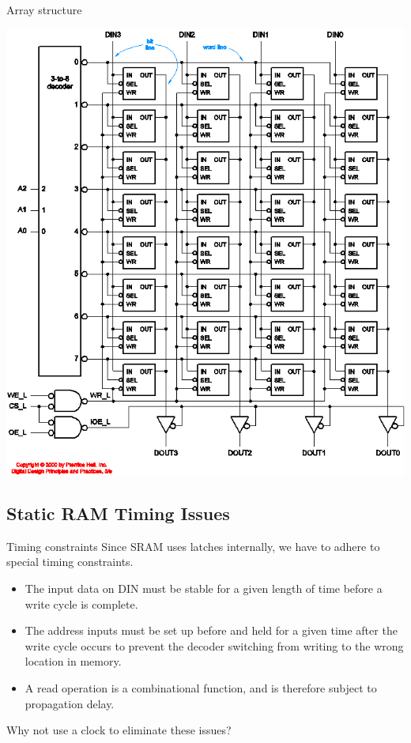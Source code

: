 \begin{frame}{Array structure}
  \begin{center}
    \includegraphics[scale=0.5]{SRAMStructure}
  \end{center}
\end{frame}

\subsection{Static RAM Timing Issues}

\begin{frame}{Timing constraints}
  Since SRAM uses latches internally, we have to adhere to special timing constraints.
  \begin{itemize}
    \item The input data on DIN must be stable for a given length of time before a write cycle is complete.
    \item The address inputs must be set up before and held for a given time after the write cycle occurs to prevent the decoder switching from writing to the wrong location in memory.
    \item A read operation is a combinational function, and is therefore subject to propagation delay.
  \end{itemize}
  Why not use a clock to eliminate these issues?
\end{frame}

